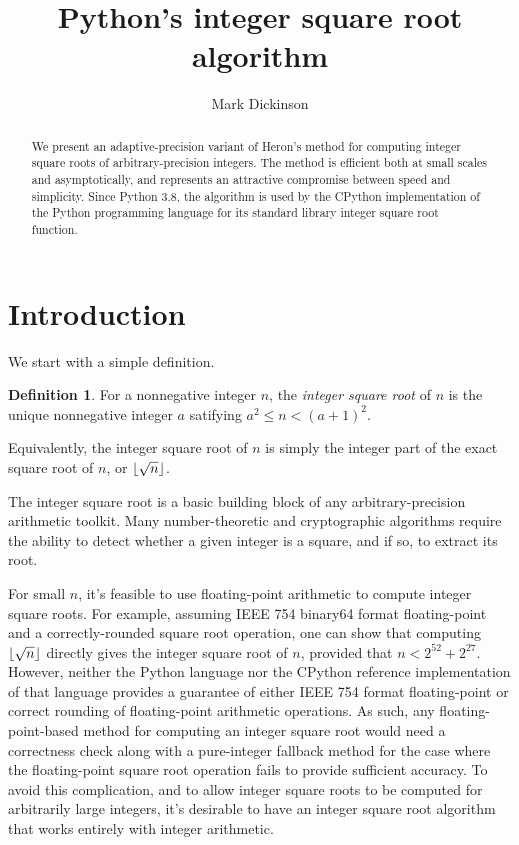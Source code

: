 \documentclass[a4paper]{article}
\title{Python's integer square root algorithm}
\author{Mark Dickinson}
\DeclarePairedDelimiter\floor{\lfloor}{\rfloor}
\theoremstyle{plain}
\theoremstyle{definition}
\newtheorem{definition}[theorem]{Definition}
\begin{document}
\lstset{language=Python}
\maketitle
\begin{abstract}
We present an adaptive-precision variant of Heron's method for computing
integer square roots of arbitrary-precision integers. The method is efficient
both at small scales and asymptotically, and represents an attractive
compromise between speed and simplicity. Since Python 3.8, the algorithm is
used by the CPython implementation of the Python programming language for its
standard library integer square root function.
\end{abstract}
\section{Introduction}

We start with a simple definition.

\begin{definition}
  For a nonnegative integer $n$, the \emph{integer square root} of $n$ is
  the unique nonnegative integer $a$ satifying $a^2 \le n < (a + 1)^2$.
\end{definition}

Equivalently, the integer square root of $n$ is simply the integer part
of the exact square root of $n$, or $\floor{\sqrt n}$.

The integer square root is a basic building block of any arbitrary-precision
arithmetic toolkit. Many number-theoretic and cryptographic algorithms require
the ability to detect whether a given integer is a square, and if so, to
extract its root.

For small $n$, it's feasible to use floating-point arithmetic to
compute integer square roots. For example, assuming IEEE 754 binary64 format
floating-point and a correctly-rounded square root operation, one can show that
computing $\floor{\sqrt n}$ directly gives the integer square root of $n$,
provided that $n < 2^{52} + 2^{27}$. However, neither the Python language nor
the CPython reference implementation of that language provides a guarantee of
either IEEE 754 format floating-point or correct rounding of floating-point
arithmetic operations. As such, any floating-point-based method for computing
an integer square root would need a correctness check along with a pure-integer
fallback method for the case where the floating-point square root operation
fails to provide sufficient accuracy. To avoid this complication, and to allow
integer square roots to be computed for arbitrarily large integers, it's
desirable to have an integer square root algorithm that works entirely with
integer arithmetic.
\end{document}
